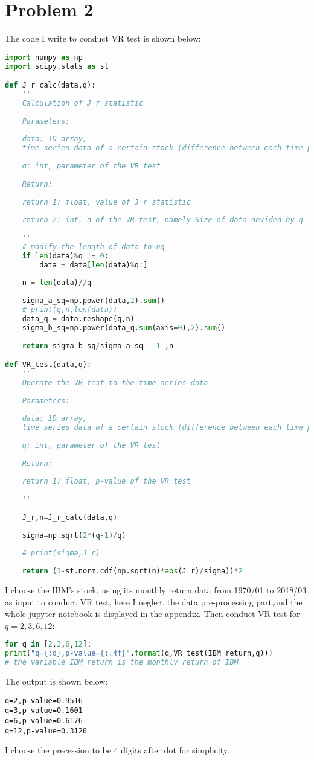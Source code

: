 \documentclass{article}
\theoremstyle{break}
\begin{document}
    \section{Problem 2}
    The code I write to conduct VR test is shown below:
    \begin{lstlisting}[language={python}]
import numpy as np
import scipy.stats as st

def J_r_calc(data,q):
    '''
    Calculation of J_r statistic
    
    Parameters:
    
    data: 1D array, 
    time series data of a certain stock (difference between each time point)
    
    q: int, parameter of the VR test
    
    Return:
    
    return 1: float, value of J_r statistic
    
    return 2: int, n of the VR test, namely Size of data devided by q
    
    '''
    # modify the length of data to nq
    if len(data)%q != 0:
        data = data[len(data)%q:]
    
    n = len(data)//q
    
    sigma_a_sq=np.power(data,2).sum()
    # print(q,n,len(data))
    data_q = data.reshape(q,n)
    sigma_b_sq=np.power(data_q.sum(axis=0),2).sum()
    
    return sigma_b_sq/sigma_a_sq - 1 ,n

def VR_test(data,q):
    '''
    Operate the VR test to the time series data
    
    Parameters:
    
    data: 1D array, 
    time series data of a certain stock (difference between each time point)
    
    q: int, parameter of the VR test
    
    Return:
    
    return 1: float, p-value of the VR test
    
    '''
    
    J_r,n=J_r_calc(data,q)
    
    sigma=np.sqrt(2*(q-1)/q)
    
    # print(sigma,J_r)
    
    return (1-st.norm.cdf(np.sqrt(n)*abs(J_r)/sigma))*2
    \end{lstlisting}
    I choose the IBM's stock, using its monthly return data from 1970/01 to 2018/03 as input to conduct VR test, here I neglect the data pre-processing part,and the whole jupyter notebook is displayed in the appendix.
    \newline
    Then conduct VR test for $q=2,3,6,12$:
    \begin{lstlisting}[language={python}]
for q in [2,3,6,12]:
print("q={:d},p-value={:.4f}".format(q,VR_test(IBM_return,q)))
# the variable IBM_return is the monthly return of IBM
    \end{lstlisting}
    The output is shown below:
    \begin{lstlisting}
q=2,p-value=0.9516
q=3,p-value=0.1601
q=6,p-value=0.6176
q=12,p-value=0.3126
    \end{lstlisting}
    I choose the precession to be 4 digits after dot for simplicity.
\end{document}
